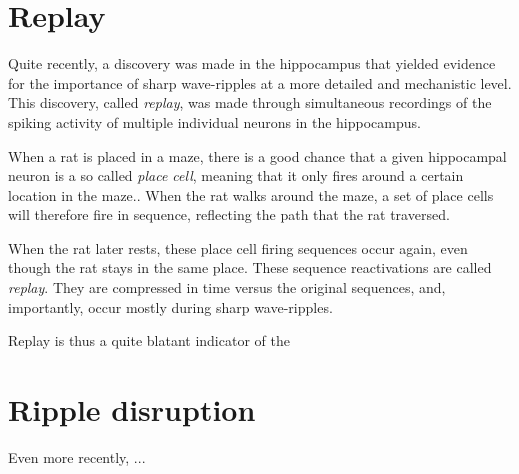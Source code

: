 \section{Replay}

Quite recently, a discovery was made in the hippocampus that yielded evidence for the importance of sharp wave-ripples at a more detailed and mechanistic level. This discovery, called \emph{replay}, was made through simultaneous recordings of the spiking activity of multiple individual neurons in the hippocampus.\footnotemark{}


When a rat is placed in a maze, there is a good chance that a given hippocampal neuron is a so called \emph{place cell}, meaning that it only fires around a certain location in the maze.\footnotemark{}. When the rat walks around the maze, a set of place cells will therefore fire in sequence, reflecting the path that the rat traversed.


When the rat later rests, these place cell firing sequences occur again, even though the rat stays in the same place. These sequence reactivations are called \emph{replay}. They are compressed in time versus the original sequences, and, importantly, occur mostly during sharp wave-ripples.

Replay is thus a quite blatant indicator of the 





\section{Ripple disruption}

Even more recently, ...

